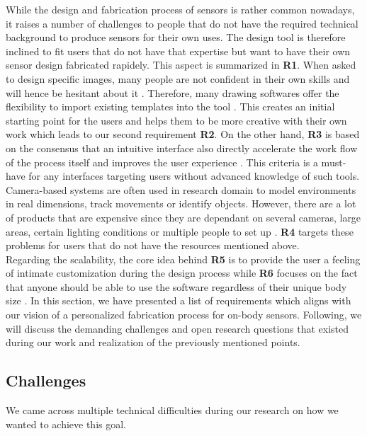 While the design and fabrication process of sensors is rather common nowadays, it raises a number of challenges to people that do not have the required technical background to produce sensors for their own uses. The design tool is therefore inclined to fit users that do not have that expertise but want to have their own sensor design fabricated rapidely. This aspect is summarized in \textbf{R1}. When asked to design specific images, many people are not confident in their own skills and will hence be hesitant about it \cite{Dixon:2010:IUS:1753326.1753459}. Therefore, many drawing softwares offer the flexibility to import existing templates into the tool \cite{Iarussi:2013:DAA:2501988.2501997, Fernquist:2011:SRE:2047196.2047245}. This creates an initial starting point for the users and helps them to be more creative with their own work which leads to our second requirement \textbf{R2}. On the other hand, \textbf{R3} is based on the consensus that an intuitive interface also directly accelerate the work flow of the process itself and improves the user experience \cite{Hassenzahl:2008:UET:1512714.1512717}. This criteria is a must-have for any interfaces targeting users without advanced knowledge of such tools.\\ Camera-based systems are often used in research domain to model environments in real dimensions, track movements or identify objects. However, there are a lot of products that are expensive since they are dependant on several cameras, large areas, certain lighting conditions or multiple people to set up \cite{Rahimian:2015:OCP:2821592.2821596, Dezfuli:2012:PIP:2325616.2325623}. \textbf{R4} targets these problems for users that do not have the resources mentioned above.\\Regarding the scalability, the core idea behind \textbf{R5} is to provide the user a feeling of intimate customization during the design process \cite{Kao:2016:DRP:2971763.2971777} while \textbf{R6} focuses on the fact that anyone should be able to use the software regardless of their unique body size \cite{Nittala:2018:MST:3173574.3173607, Dezfuli:2012:PIP:2325616.2325623}.\newpara
In this section, we have presented a list of requirements which aligns with our vision of a personalized fabrication process for on-body sensors. Following, we will discuss the demanding challenges and open research questions that existed during our work and realization of the previously mentioned points.
\subsection{Challenges}
We came across multiple technical difficulties during our research on how we wanted to achieve this goal. 
